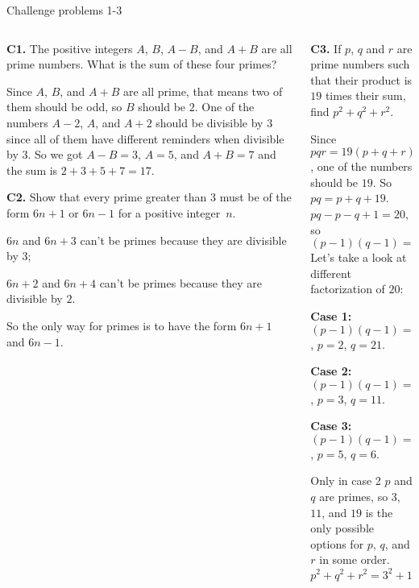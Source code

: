 \documentclass[9pt,aspectratio=169,]{beamer}
\begin{document}
\begin{frame}{Challenge problems 1-3}
  \begin{columns}[T]
    \begin{column}{0.5\textwidth}
      \begin{problem}
          \textbf{C1.} The positive integers $A$, $B$, $A-B$, and $A+B$ are all prime numbers. What is the sum of these four primes?
      \end{problem}
      Since $A$, $B$, and $A + B$ are all prime, that means two of them should be odd, so $B$ should be $2$. One of the numbers $A - 2$, $A$, and $A + 2$ should be divisible by $3$ since all of them have different reminders when divisible by $3$. So we got $A - B = 3$, $A = 5$, and $A + B = 7$ and the sum is $2 + 3 + 5 + 7 = \boxed{17}$.

      \begin{problem}
        \textbf{C2.} Show that every prime greater than $3$ must be of the form $6n+1$ or $6n-1$ for a positive integer~$n$.
      \end{problem}
      $6n$ and $6n + 3$ can't be primes because they are divisible by $3$;
      
      $6n + 2$ and $6n + 4$  can't be primes because they are divisible by $2$.

      So the only way for primes is to have the form $6n+1$ and $6n-1$.
    \end{column}
    \begin{column}{0.5\textwidth}
      \begin{problem}
        \textbf{C3.} If $p$, $q$ and $r$ are prime numbers such that their product is $19$ times their sum, find $p^2 + q^2 + r^2$.
      \end{problem}
      Since $pqr = 19(p + q + r)$, one of the numbers should be $19$. So $pq = p + q + 19$. $pq - p - q + 1 = 20$, so \[(p - 1)(q - 1) = 20.\]
      Let's take a look at different factorization of $20$:

      \textbf{Case 1:} $(p - 1)(q - 1) = 1 \times 20$, $p = 2$, $q = 21$.

      \textbf{Case 2:} $(p - 1)(q - 1) = 2 \times 10$, $p = 3$, $q = 11$.

      \textbf{Case 3:} $(p - 1)(q - 1) = 4 \times 5$, $p = 5$, $q = 6$.

      Only in case 2 $p$ and $q$ are primes, so $3$, $11$, and $19$ is the only possible options for $p$, $q$, and $r$ in some order. 
      \[ p^2 + q^2 + r^2 = 3^2 + 11^2 + 19^2 = \boxed{491}.\]
    \end{column}
  \end{columns}
\end{frame}
\end{document}
